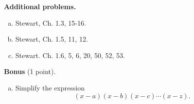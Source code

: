 \documentclass[12pt]{article}
\begin{document}
{\bf Additional problems.}
\begin{enumerate}[(a)]
\item
Stewart, Ch. 1.3, 15-16.

\item
Stewart, Ch. 1.5, 11, 12.

\item
Stewart. Ch. 1.6, 5, 6, 20, 50, 52, 53.
\end{enumerate}
{\bf Bonus} (1 point).
\begin{enumerate}[(a)]
\item
Simplify the expression
$$(x - a) (x - b) (x - c) \cdots (x - z).$$
\end{enumerate}
\end{document}
